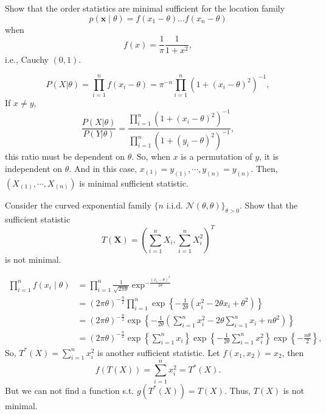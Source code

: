 \begin{ex}
    Show that the order statistics are minimal sufficient for the location family
    \[
        p(\mathbf{x} \mid \theta)=f\left(x_{1}-\theta\right) \ldots f\left(x_{n}-\theta\right)
    \]
    when
    \[
        f(x)=\frac{1}{\pi} \frac{1}{1+x^{2}},
    \]
    i.e., Cauchy \((0,1)\). 
\end{ex}

\begin{solution}
    \[
        P(X|\theta)=\prod_{i=1}^nf(x_i-\theta)=\pi^{-n}\prod_{i=1}^n(1+(x_i-\theta)^2)^{-1}, 
    \]
    If $x\neq y$, 
    \[
        \frac{P(X|\theta)}{P(Y|\theta)}=\frac{\prod_{i=1}^n(1+(x_i-\theta)^2)^{-1}}{\prod_{i=1}^n(1+(y_i-\theta)^2)^{-1}}, 
    \]
    this ratio must be dependent on $\theta$. So, when $x$ is a permutation of $y$, it is independent on $\theta$. And in this case, $x_{(1)}=y_{(1)}, \cdots, y_{(n)}=y_{(n)}$. Then, $(X_{(1)}, \cdots, X_{(n)})$ is minimal sufficient statistic. 
\end{solution}

\begin{ex}
    Consider the curved exponential family \(\{n \text { i.i.d. } \mathcal{N}(\theta, \theta)\}_{\theta>0}\). Show that the sufficient statistic
    \[
        T(\mathbf{X})=\left(\sum_{i=1}^{n} X_{i}, \sum_{i=1}^{n} X_{i}^{2}\right)^T
    \]
    is not minimal. 
\end{ex}

\begin{solution}
    \[
        \begin{aligned} 
            \prod_{i=1}^{n} f\left(x_{i} \mid \theta\right) &=\prod_{i=1}^{n} \frac{1}{\sqrt{2 \pi \theta}} \exp^{-\frac{\left(x_{i}-\theta\right)^{2}}{2 \theta}} \\ &=(2 \pi \theta)^{-\frac{n}{2}} \prod_{i=1}^{n} \exp \left\{-\frac{1}{2 \theta}\left(x_{i}^{2}-2 \theta x_{i}+\theta^{2}\right)\right\} \\ &=(2 \pi \theta)^{-\frac{n}{2}} \exp \left\{-\frac{1}{2 \theta}\left(\sum_{i=1}^{n} x_{i}^{2}-2 \theta \sum_{i=1}^{n} x_{i}+n \theta^{2}\right)\right\} \\ &=(2 \pi \theta)^{-\frac{n}{2}} \exp \left\{\sum_{i=1}^{n} x_{i}\right\} \exp \left\{-\frac{1}{2 \theta} \sum_{i=1}^{n} x_{i}^{2}\right\} \exp \left\{-\frac{n \theta}{2}\right\}, 
        \end{aligned}
    \]
    So, $T^*(X)=\sum_{i=1}^nx_i^2$ is another sufficient statistic. Let $f(x_1,x_2)=x_2$, then 
    \[
        f(T(X))=\sum_{i=1}^nx_i^2 = T^*(X). 
    \]
    But we can not find a function s.t. $g(T^*(X))=T(X)$. Thus, $T(X)$ is not minimal. 
\end{solution}

